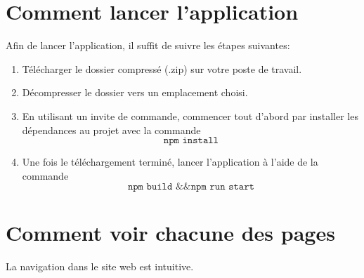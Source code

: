 \documentclass[12pt]{/home/samuel/Documents/GLO/latex/documentClass/GLO_ULAVAL}
\begin{document}
\modifyItemize{}
\maketitle

\chapter*{Comment lancer l'application}
Afin de lancer l'application, il suffit de suivre les étapes suivantes:
\begin{enumerate}
  \item Télécharger le dossier compressé (.zip) sur votre poste de travail.
  \item Décompresser le dossier vers un emplacement choisi.
  \item En utilisant un invite de commande, commencer tout d'abord par installer les dépendances au projet avec la commande
  $$\texttt{npm install}$$
  \item Une fois le téléchargement terminé, lancer l'application à l'aide de la commande
  $$\texttt{npm build \&\& npm run start}$$
\end{enumerate}

\chapter*{Comment voir chacune des pages}

La navigation dans le site web est intuitive. \\
\end{document}
